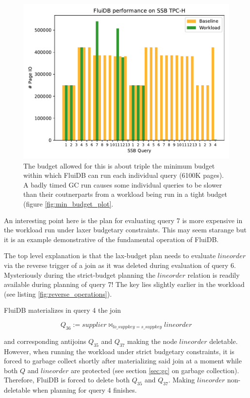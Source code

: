 \begin{figure}[p]
\centering
\includegraphics[width=.9\linewidth]{./plans/io_perf_61000.pdf}

\caption{\label{fig:large_budget_plot} \ioperfdescr The budget
  allowed for this is about triple the minimum budget within which
  FluiDB can run each individual query (6100K pages). A badly timed GC
  run causes some individual queries to be slower than their
  coutnerparts from a workload being run in a tight budget (figure
  \ref{fig:min_budget_plot}.}
\end{figure}

An interesting point here is the plan for evaluating query 7 is more
expensive in the workload run under laxer budgetary constraints. This
may seem starange but it is an example demonstrative of the
fundamental operation of FluiDB.

The top level explanation is that the lax-budget plan needs to
evaluate \(\mathit{lineorder}\) via the reverse trigger of a join as
it was deleted during evaluation of query 6. Mysteriously during the
strict-budget planning the \(\mathit{lineorder}\) relation is readily
available during planning of query 7! The key lies slightly earlier in
the workload (see listing \ref{fig:reverse_operations}).

FluiDB materializes in query 4 the join

\[
Q_{36} := \mathit{supplier} \Join_{\mathit{lo\_suppkey} = \mathit{s\_suppkey}} \mathit{lineorder}
\]

and corresponding antijoins \(Q_{35}\) and \(Q_{37}\) making the node
\(\mathit{lineorder}\) deletable. However, when running the workload
under strict budgetary constraints, it is forced to garbage collect
shortly after materializing said join at a moment while both \(Q\) and
\(\mathit{lineorder}\) are protected (see section \ref{sec:gc} on
garbage collection). Therefore, FluiDB is forced to delete both
\(Q_{35}\) and \(Q_{37}\). Making \(\mathit{lineorder}\) non-deletable
when planning for query 4 finishes.

